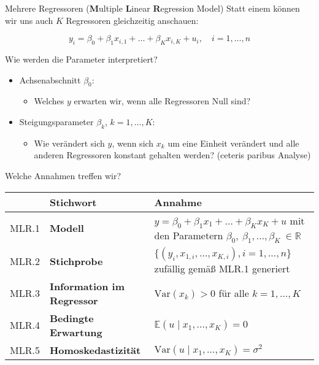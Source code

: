\documentclass[
  ignorenonframetext,
  t,
  aspectratio=169]{beamer}
\begin{document}
\begin{frame}{Mehrere Regressoren (\textbf{M}ultiple \textbf{L}inear
\textbf{R}egression Model)}
\protect\hypertarget{mehrere-regressoren-multiple-linear-regression-model}{}
Statt einem können wir uns auch \(K\) Regressoren gleichzeitig
anschauen:

\[y_i = \beta_0 + \beta_1 x_{i,1} + \ldots + \beta_K x_{i,K} + u_i, \quad i = 1,\dots,n\]

Wie werden die Parameter interpretiert?

\begin{itemize}
  \item Achsenabschnitt $\beta_0$: 
  \begin{itemize}
    \item[] Welches $y$ erwarten wir, wenn alle Regressoren Null sind?
  \end{itemize}
  \item Steigungsparameter $\beta_k$, $k = 1,\dots,K$:
  \begin{itemize}
    \item[] Wie verändert sich $y$, wenn sich $x_k$ um eine Einheit verändert und alle anderen Regressoren konstant gehalten werden? (ceteris paribus Analyse)
  \end{itemize}
\end{itemize}
\end{frame}

\begin{frame}{Welche Annahmen treffen wir?}
\protect\hypertarget{welche-annahmen-treffen-wir}{}
\vspace{-0.5cm}
\small
\begin{center}
\renewcommand{\arraystretch}{1.5}
\begin{tabular}{lp{4cm}p{7cm}}
       & Stichwort                         & Annahme  \\ \hline
 MLR.1 & \textbf{Modell}                   & $y = \beta_0 + \beta_1 x_1 + \dots + \beta_K x_K + u$ mit den Parametern $\beta_0,\ \beta_1, \dots, \beta_K\ \in \mathbb{R}$ \\
 MLR.2 & \textbf{Stichprobe}               & $\{(y_i , x_{1,i}, \dots, x_{K,i} ), i = 1, \dots, n\}$ zufällig gemäß MLR.1 generiert \\
 MLR.3 & \textbf{Information im Regressor} & $\text{Var}(x_k) > 0$ für alle $k=1,\dots,K$  \\
 MLR.4 & \textbf{Bedingte Erwartung}       & $\mathbb{E}(u\mid x_1,\dots,x_K) = 0$  \\
 MLR.5 & \textbf{Homoskedastizität}        & $\text{Var}(u\mid x_1,\dots,x_K)=\sigma^2$ \\
\end{tabular}
\end{center}
\normalsize
\end{frame}
\end{document}
